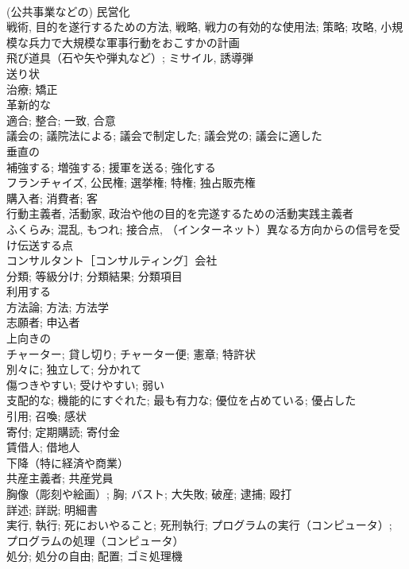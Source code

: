 \documentclass[8pt]{extreport}
\begin{document}
\begin{CJK}{UTF8}{min}
\\	(公共事業などの) 民営化	
\\	戦術, 目的を遂行するための方法, 戦略, 戦力の有効的な使用法; 策略; 攻略, 小規模な兵力で大規模な軍事行動をおこすかの計画	
\\	飛び道具（石や矢や弾丸など）; ミサイル, 誘導弾	
\\	送り状	
\\	治療; 矯正	
\\	革新的な	
\\	適合; 整合; 一致, 合意	
\\	議会の; 議院法による; 議会で制定した; 議会党の; 議会に適した	
\\	垂直の	
\\	補強する; 増強する; 援軍を送る; 強化する	
\\	フランチャイズ, 公民権; 選挙権; 特権; 独占販売権	
\\	購入者; 消費者; 客	
\\	行動主義者, 活動家, 政治や他の目的を完遂するための活動実践主義者	
\\	ふくらみ; 混乱, もつれ; 接合点, （インターネット）異なる方向からの信号を受け伝送する点	
\\	コンサルタント［コンサルティング］会社	
\\	分類; 等級分け; 分類結果; 分類項目	
\\	利用する	
\\	方法論; 方法; 方法学	
\\	志願者; 申込者	
\\	上向きの	
\\	チャーター; 貸し切り; チャーター便; 憲章; 特許状	
\\	別々に; 独立して; 分かれて	
\\	傷つきやすい; 受けやすい; 弱い	
\\	支配的な; 機能的にすぐれた; 最も有力な; 優位を占めている; 優占した	
\\	引用; 召喚; 感状	
\\	寄付; 定期購読; 寄付金	
\\	賃借人; 借地人	
\\	下降（特に経済や商業）	
\\	共産主義者; 共産党員	
\\	胸像（彫刻や絵画）; 胸; バスト; 大失敗; 破産; 逮捕; 殴打	
\\	詳述; 詳説; 明細書	
\\	実行, 執行; 死においやること; 死刑執行; プログラムの実行（コンピュータ）; プログラムの処理（コンピュータ）	
\\	処分; 処分の自由; 配置; ゴミ処理機	

\end{CJK}
\end{document}
